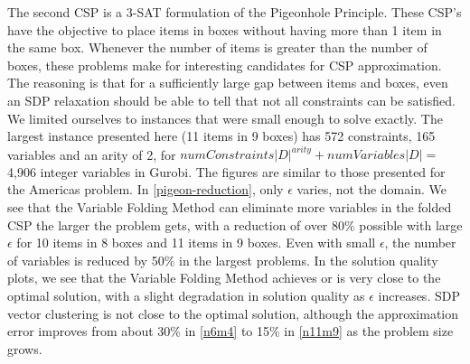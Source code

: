 \documentclass[12pt]{article} %
\begin{document}
\FloatBarrier
The second CSP is a 3-SAT formulation of the Pigeonhole Principle. These CSP's have the objective to place items in boxes without having more than 1 item in the same box. Whenever the number of items is greater than the number of boxes, these problems make for interesting candidates for CSP approximation. The reasoning is that for a sufficiently large gap between items and boxes, even an SDP relaxation should be able to tell that not all constraints can be satisfied. We limited ourselves to instances that were small enough to solve exactly. The largest instance presented here (11 items in 9 boxes) has 572 constraints, 165 variables and an arity of 2, for $numConstraints |D|^{arity} + numVariables |D|=$4,906 integer variables in Gurobi. The figures are similar to those presented for the Americas problem. In \autoref{pigeon-reduction}, only $\epsilon$ varies, not the domain. We see that the Variable Folding Method can eliminate more variables in the folded CSP the larger the problem gets, with a reduction of over 80\% possible with large $\epsilon$ for 10 items in 8 boxes and 11 items in 9 boxes. Even with small $\epsilon$, the number of variables is reduced by 50\% in the largest problems. In the solution quality plots, we see that the Variable Folding Method achieves or is very close to the optimal solution, with a slight degradation in solution quality as $\epsilon$ increases. SDP vector clustering is not close to the optimal solution, although the approximation error improves from about 30\% in \ref{n6m4} to 15\% in \ref{n11m9} as the problem size grows.
\end{document}
